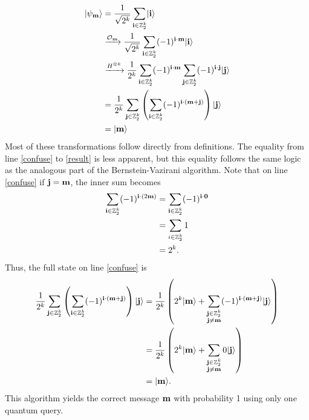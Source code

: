 \documentclass[12pt,twoside]{reedthesis}
\theoremstyle{definition}
\newlength{\arrow}
\newcommand{\Z}{\mathbb{Z}}
\newcommand{\ket}[1]{\ensuremath{\lvert #1\rangle}\xspace}
\begin{document}
\begin{align}
\ket{\psi_\mess}
& =  \frac{1}{\sqrt{2^\mlen}} \sum_{\mathbf{i} \in \Z_2^\mlen} \ket{\mathbf{i}} \\
& \xrightarrow{\mathcal{O}_\mess} \frac{1}{\sqrt{2^\mlen}} \sum_{\mathbf{i} \in \Z_2^\mlen} (-1)^{\mathbf{i} \cdot \mess} \ket{\mathbf{i}} \\
& \xrightarrow{H^{\otimes \mlen}} \frac{1}{2^\mlen} \sum_{\mathbf{i} \in \Z_2^\mlen} (-1)^{\mathbf{i} \cdot \mess} \sum_{\mathbf{j} \in \Z_2^\mlen} (-1)^{\mathbf{i} \cdot \mathbf{j}} \ket{\mathbf{j}} \\
& = \frac{1}{2^\mlen} \sum_{\mathbf{j} \in \Z_2^\mlen} \left( \sum_{\mathbf{i} \in \Z_2^\mlen} (-1)^{\mathbf{i}\cdot (\mess +\mathbf{j})} \right) \ket{\mathbf{j}} \label{confuse}\\
& = \ket{\mess} \label{result}
\end{align}
Most of these transformations follow directly from definitions. The equality from line \ref{confuse} to \ref{result} is less apparent, but this equality follows the same logic as the analogous part of the Bernstein-Vazirani algorithm. Note that on line \ref{confuse} if $\mathbf{j} = \mathbf{m}$, the inner sum becomes 
\begin{align*}
\sum_{\mathbf{i} \in \Z_2^\mlen} (-1)^{\mathbf{i} \cdot (2\mess)} 
&  = \sum_{\mathbf{i} \in \Z_2^\mlen} (-1)^{\mathbf{i} \cdot \mathbf{0}} \\
&= \sum_{i \in \Z_2^\mlen} 1 \\
& = {2^\mlen}.
\end{align*}
Thus, the full state on line \ref{confuse} is 
\begin{align*}
\frac{1}{2^\mlen} \sum_{\mathbf{j} \in \Z_2^\mlen} \left( \sum_{\mathbf{i} \in \Z_2^\mlen} (-1)^{\mathbf{i}\cdot (\mess +\mathbf{j})} \right) \ket{\mathbf{j}}
& = \frac{1}{2^\mlen} \left (2^\mlen \ket{\mess}+  \sum\limits_{\substack{\mathbf{j} \in \Z_2^\mlen \\ \mathbf{j} \neq \mess}}
 (-1)^{\mathbf{i}\cdot (\mess +\mathbf{j})}\ket{\mathbf{j}} \right) \\
 & = \frac{1}{2^\mlen} \left (2^\mlen \ket{\mess}+  \sum\limits_{\substack{\mathbf{j} \in \Z_2^\mlen \\ \mathbf{j} \neq \mess}}
0\ket{\mathbf{j}} \right) \\
& = \ket{\mess}.
\end{align*}
This algorithm yields the correct message $\mathbf{m}$ with probability 1 using only one quantum query.
\end{document}
